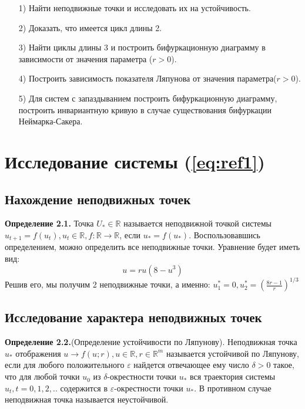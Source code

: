 \documentclass[11pt]{article}
\begin{document}
	\begin{itemize}
		\item [1)]{Найти неподвижные точки и исследовать их на устойчивость.}
		\item [2)]{Доказать, что имеется цикл длины 2.}
		\item [3)]{Найти циклы длины 3 и построить бифуркационную диаграмму в зависимости от значения параметра ($r > 0$).}
		\item [4)]{Построить зависимость показателя Ляпунова от значения параметра($r > 0$).}
		\item [5)]{Для систем с запаздыванием построить бифуркационную диаграмму, построить инвариантную кривую в случае существования бифуркации Неймарка-Сакера.}
	\end{itemize}	
	\newpage
	
	{\vspace*{-2cm} \hspace*{-1cm}\section{Исследование системы (\ref{eq:ref1})} }
	{\subsection{Нахождение неподвижных точек}}
	{\hspace*{-0.8cm} \textbf{Определение 2.1.} Точка $U_* \in \mathds{R}$ называется неподвижной точкой системы $u_{t+1} = f(u_t), u_t \in \mathds{R}, f : \mathds{R} \rightarrow \mathds{R}$, если $u_* = f(u_*).$ }
	{Воспользовавшись определением, можно определить все неподвижные точки. Уравнение будет иметь вид:}
	\[ u = ru(8 - u^3)\]
	{Решив его, мы получим 2 неподвижные точки, а именно: $u_1^*=0,u_2^*=(\frac{8r - 1}{r})^{1/3}$}
	
	{\subsection{Исследование характера неподвижных точек}}
	{\hspace*{-0.8cm} \textbf{Определение 2.2.}(Определение устойчивости по Ляпунову). Неподвижная точка $u_*$ отображения $u \rightarrow f(u;r), u \in \mathds{R}, r \in \mathds{R}^m$ называется устойчивой по Ляпунову, если для любого положительного $\varepsilon$ найдется отвечающее ему число $\delta > 0$ такое, что для любой точки $u_0$ из $\delta$-окрестности точки $u_*$ вся траектория системы $u_t, t = 0,1,2,..$ содержится в $\varepsilon$-окрестности точки $u_*$. В противном случае неподвижная точка называется неустойчивой.}
\end{document}
